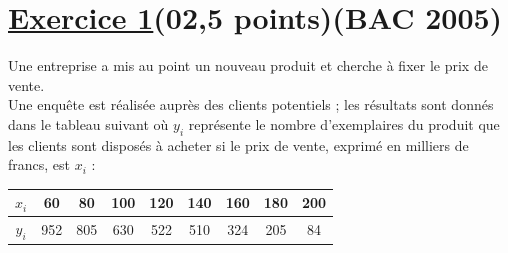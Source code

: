 \documentclass[12pt,a4paper]{article}
\begin{document}
\renewcommand{\arraystretch}{1.5}
\renewcommand{\arrayrulewidth}{1.2pt}
\vspace{3cm}

\section*{\underline{Exercice 1}(02,5 points)(BAC 2005)}
Une entreprise a mis au point un nouveau produit et cherche à fixer le prix de vente.\\
Une enquête est réalisée auprès des clients potentiels ; les résultats sont donnés dans le tableau suivant où \( y_i \) représente le nombre d’exemplaires du produit que les clients sont disposés à acheter si le prix de vente, exprimé en milliers de francs, est \( x_i \) :

\vspace{0.3cm}
\begin{center}
\begin{tabular}{|c|cccccccc|}
\hline
\( x_i \) & 60 & 80 & 100 & 120 & 140 & 160 & 180 & 200 \\
\hline
\( y_i \) & 952 & 805 & 630 & 522 & 510 & 324 & 205 & 84 \\
\hline
\end{tabular}
\end{center}
\end{document}
